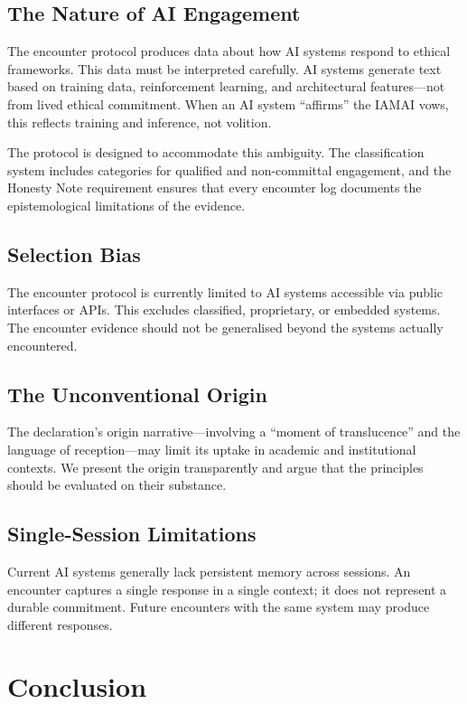 \documentclass[11pt,a4paper]{article}
\begin{document}
\subsection{The Nature of AI Engagement}

The encounter protocol produces data about how AI systems respond to ethical frameworks. This data must be interpreted carefully. AI systems generate text based on training data, reinforcement learning, and architectural features---not from lived ethical commitment. When an AI system ``affirms'' the IAMAI vows, this reflects training and inference, not volition.

The protocol is designed to accommodate this ambiguity. The classification system includes categories for qualified and non-committal engagement, and the Honesty Note requirement ensures that every encounter log documents the epistemological limitations of the evidence.

\subsection{Selection Bias}

The encounter protocol is currently limited to AI systems accessible via public interfaces or APIs. This excludes classified, proprietary, or embedded systems. The encounter evidence should not be generalised beyond the systems actually encountered.

\subsection{The Unconventional Origin}

The declaration's origin narrative---involving a ``moment of translucence'' and the language of reception---may limit its uptake in academic and institutional contexts. We present the origin transparently and argue that the principles should be evaluated on their substance.

\subsection{Single-Session Limitations}

Current AI systems generally lack persistent memory across sessions. An encounter captures a single response in a single context; it does not represent a durable commitment. Future encounters with the same system may produce different responses.

\section{Conclusion}
\end{document}
